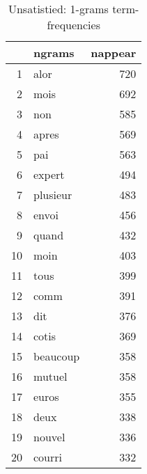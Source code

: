 \begin{table}[ht]
\centering
\begin{tabular}{rlr}
  \hline
 & ngrams & nappear \\ 
  \hline
1 & alor & 720 \\ 
  2 & mois & 692 \\ 
  3 & non & 585 \\ 
  4 & apres & 569 \\ 
  5 & pai & 563 \\ 
  6 & expert & 494 \\ 
  7 & plusieur & 483 \\ 
  8 & envoi & 456 \\ 
  9 & quand & 432 \\ 
  10 & moin & 403 \\ 
  11 & tous & 399 \\ 
  12 & comm & 391 \\ 
  13 & dit & 376 \\ 
  14 & cotis & 369 \\ 
  15 & beaucoup & 358 \\ 
  16 & mutuel & 358 \\ 
  17 & euros & 355 \\ 
  18 & deux & 338 \\ 
  19 & nouvel & 336 \\ 
  20 & courri & 332 \\ 
   \hline
\end{tabular}
\caption{Unsatistied: 1-grams term-frequencies} 
\label{tab:tf_inf_1}
\end{table}
